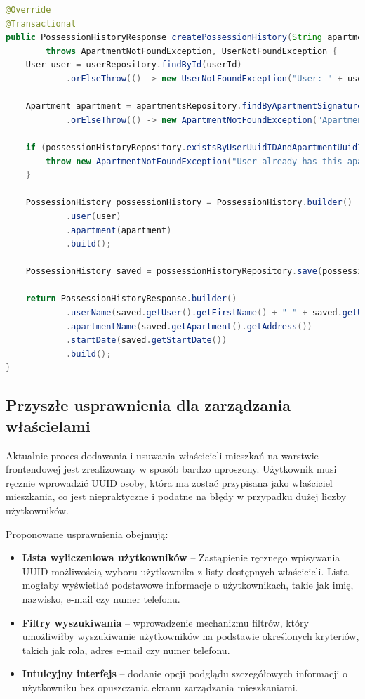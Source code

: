 \begin{lstlisting}[language=Java, caption=Przypisywanie właścicieli w \texttt{ApartmentsServiceImp}]
@Override
@Transactional
public PossessionHistoryResponse createPossessionHistory(String apartmentSignature, UUID userId)
        throws ApartmentNotFoundException, UserNotFoundException {
    User user = userRepository.findById(userId)
            .orElseThrow(() -> new UserNotFoundException("User: " + userId + " not found"));

    Apartment apartment = apartmentsRepository.findByApartmentSignature(apartmentSignature)
            .orElseThrow(() -> new ApartmentNotFoundException("Apartment with signature: " + apartmentSignature + " not found"));

    if (possessionHistoryRepository.existsByUserUuidIDAndApartmentUuidID(userId, apartment.getUuidID())) {
        throw new ApartmentNotFoundException("User already has this apartment assigned");
    }

    PossessionHistory possessionHistory = PossessionHistory.builder()
            .user(user)
            .apartment(apartment)
            .build();

    PossessionHistory saved = possessionHistoryRepository.save(possessionHistory);

    return PossessionHistoryResponse.builder()
            .userName(saved.getUser().getFirstName() + " " + saved.getUser().getLastName())
            .apartmentName(saved.getApartment().getAddress())
            .startDate(saved.getStartDate())
            .build();
}
\end{lstlisting}

\subsection{Przyszłe usprawnienia dla zarządzania właścielami}

Aktualnie proces dodawania i usuwania właścicieli mieszkań na warstwie frontendowej jest zrealizowany w sposób bardzo uproszony. Użytkownik musi ręcznie wprowadzić UUID osoby, która ma zostać przypisana jako właściciel mieszkania, co jest niepraktyczne i podatne na błędy w przypadku dużej liczby użytkowników.

Proponowane usprawnienia obejmują:

\begin{itemize}
    \item \textbf{Lista wyliczeniowa użytkowników} -- Zastąpienie ręcznego wpisywania UUID możliwością wyboru użytkownika z listy dostępnych właścicieli. Lista mogłaby wyświetlać podstawowe informacje o użytkownikach, takie jak imię, nazwisko, e-mail czy numer telefonu.
    \item \textbf{Filtry wyszukiwania} -- wprowadzenie mechanizmu filtrów, który umożliwiłby wyszukiwanie użytkowników na podstawie określonych kryteriów, takich jak rola, adres e-mail czy numer telefonu.
    \item \textbf{Intuicyjny interfejs} -- dodanie opcji podglądu szczegółowych informacji o użytkowniku bez opuszczania ekranu zarządzania mieszkaniami.
\end{itemize}

